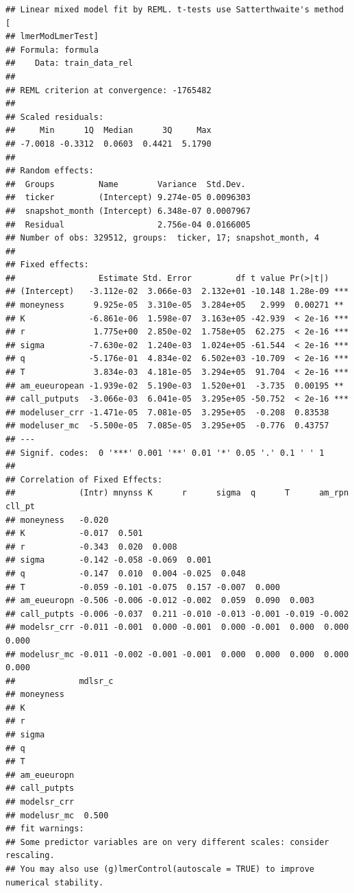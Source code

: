 \documentclass[
]{article}
\begin{document}
\begin{verbatim}
## Linear mixed model fit by REML. t-tests use Satterthwaite's method [
## lmerModLmerTest]
## Formula: formula
##    Data: train_data_rel
## 
## REML criterion at convergence: -1765482
## 
## Scaled residuals: 
##     Min      1Q  Median      3Q     Max 
## -7.0018 -0.3312  0.0603  0.4421  5.1790 
## 
## Random effects:
##  Groups         Name        Variance  Std.Dev. 
##  ticker         (Intercept) 9.274e-05 0.0096303
##  snapshot_month (Intercept) 6.348e-07 0.0007967
##  Residual                   2.756e-04 0.0166005
## Number of obs: 329512, groups:  ticker, 17; snapshot_month, 4
## 
## Fixed effects:
##                 Estimate Std. Error         df t value Pr(>|t|)    
## (Intercept)   -3.112e-02  3.066e-03  2.132e+01 -10.148 1.28e-09 ***
## moneyness      9.925e-05  3.310e-05  3.284e+05   2.999  0.00271 ** 
## K             -6.861e-06  1.598e-07  3.163e+05 -42.939  < 2e-16 ***
## r              1.775e+00  2.850e-02  1.758e+05  62.275  < 2e-16 ***
## sigma         -7.630e-02  1.240e-03  1.024e+05 -61.544  < 2e-16 ***
## q             -5.176e-01  4.834e-02  6.502e+03 -10.709  < 2e-16 ***
## T              3.834e-03  4.181e-05  3.294e+05  91.704  < 2e-16 ***
## am_eueuropean -1.939e-02  5.190e-03  1.520e+01  -3.735  0.00195 ** 
## call_putputs  -3.066e-03  6.041e-05  3.295e+05 -50.752  < 2e-16 ***
## modeluser_crr -1.471e-05  7.081e-05  3.295e+05  -0.208  0.83538    
## modeluser_mc  -5.500e-05  7.085e-05  3.295e+05  -0.776  0.43757    
## ---
## Signif. codes:  0 '***' 0.001 '**' 0.01 '*' 0.05 '.' 0.1 ' ' 1
## 
## Correlation of Fixed Effects:
##             (Intr) mnynss K      r      sigma  q      T      am_rpn cll_pt
## moneyness   -0.020                                                        
## K           -0.017  0.501                                                 
## r           -0.343  0.020  0.008                                          
## sigma       -0.142 -0.058 -0.069  0.001                                   
## q           -0.147  0.010  0.004 -0.025  0.048                            
## T           -0.059 -0.101 -0.075  0.157 -0.007  0.000                     
## am_eueuropn -0.506 -0.006 -0.012 -0.002  0.059  0.090  0.003              
## call_putpts -0.006 -0.037  0.211 -0.010 -0.013 -0.001 -0.019 -0.002       
## modelsr_crr -0.011 -0.001  0.000 -0.001  0.000 -0.001  0.000  0.000  0.000
## modelusr_mc -0.011 -0.002 -0.001 -0.001  0.000  0.000  0.000  0.000  0.000
##             mdlsr_c
## moneyness          
## K                  
## r                  
## sigma              
## q                  
## T                  
## am_eueuropn        
## call_putpts        
## modelsr_crr        
## modelusr_mc  0.500 
## fit warnings:
## Some predictor variables are on very different scales: consider rescaling. 
## You may also use (g)lmerControl(autoscale = TRUE) to improve numerical stability.
\end{verbatim}
\end{document}
